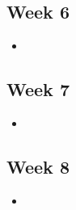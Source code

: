 \documentclass{article}
\theoremstyle{definition}
\begin{document}
\subsection*{Week 6}
\begin{itemize}[noitemsep]
    \item 
\end{itemize}

\subsection*{Week 7}
\begin{itemize}[noitemsep]
    \item 
\end{itemize}

\subsection*{Week 8}
\begin{itemize}[noitemsep]
    \item 
\end{itemize}

\newpage
 
\end{document}
